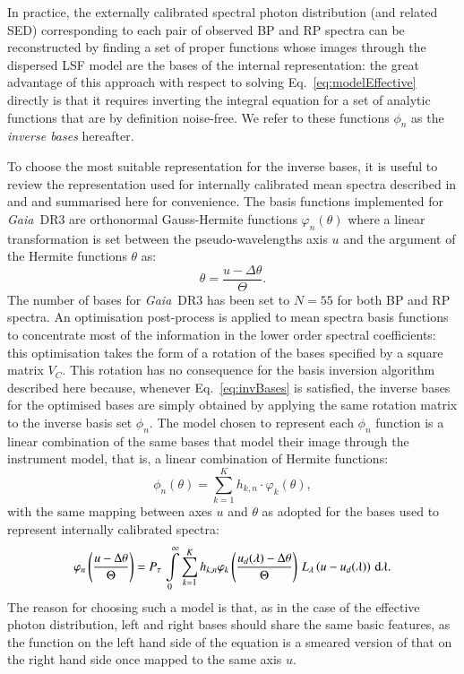 \documentclass{aa}
\newcommand{\gdr}[1]{\gaia~DR#1\xspace}
\newcommand{\gaia}{\textit{Gaia}\xspace}
\newcommand{\xp}{BP and RP\xspace}
\newcommand{\pupil}{\ensuremath{P_\tau}}
\newcommand{\equref}[1]{Eq.~\ref{eq:#1}}
\begin{document}
In practice, the externally calibrated spectral photon distribution (and related SED) corresponding to each pair of observed \xp spectra can be reconstructed 
by finding a set of proper functions whose images through the dispersed LSF model are the bases of the internal representation: the great advantage of this approach with respect to solving \equref{modelEffective} directly is that it requires inverting the integral equation for a set of analytic functions that are by definition noise-free. We refer to these functions $\phi_n$ as the \emph{inverse bases}\xspace hereafter. 

To choose the most suitable representation for the inverse bases, it is useful to review the representation used for internally calibrated mean spectra described in \citet{Carrasco2021} and \citet{DeAngeli2022} and summarised here for convenience. The basis functions implemented for \gdr3 are orthonormal Gauss-Hermite functions $\varphi_n(\theta)$ where a linear transformation is set between the pseudo-wavelengths axis $u$ and the argument of the Hermite functions $\theta$ as:
\begin{equation}
    \theta = \frac{u - \Delta \theta}{\Theta} %
.\end{equation}
The number of bases for \gdr3 has been set to $N=55$ for both \xp spectra.
An optimisation post-process is applied to mean spectra basis functions to concentrate most of the information in the lower order spectral coefficients: this optimisation takes the form of a rotation of the bases specified by a square matrix $V_C$. This rotation has no consequence for the basis inversion algorithm described here because, whenever \equref{invBases} is satisfied, the inverse bases for the optimised bases are simply obtained by applying the same rotation matrix to the inverse basis set $\phi_n$.
The model chosen to represent each $\phi_n$ function is a linear combination of the same bases that model their image through the instrument model, that is, a linear combination of Hermite functions:
\begin{equation}
    \label{eq:inverseBasisModel}
    \phi_n(\theta) = \sum_{k=1}^K h_{k,n} \cdot \varphi_k(\theta)
,\end{equation}
with the same mapping between axes $u$ and $\theta$ as adopted for the bases used to represent internally calibrated spectra:
\begin{equation}
   \label{eq:invBasesModel}
   \varphi_n\left(\frac{u - \Delta \theta}{\Theta}\right)=  \pupil\, \int\limits_0^\infty \sum_{k=1}^K h_{k,n}\varphi_k\left(\frac{u_d(\lambda) - \Delta \theta}{\Theta}\right) \, L_\lambda\left(u - u_d(\lambda)\right) \, {\rm d}\lambda
.\end{equation}
The reason for choosing such a model is that, as in the case of the effective photon distribution, left and right bases should share the same basic features,
as the function on the left hand side of the equation is a smeared version of that on the right hand side
once mapped to the same axis $u$.
\end{document}
